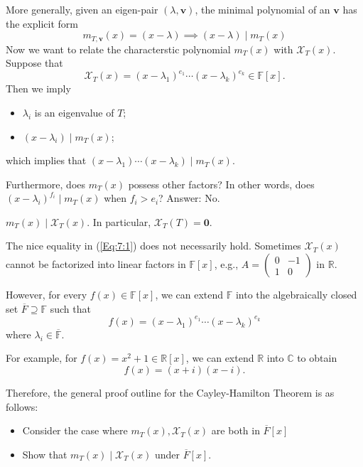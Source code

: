 \begin{remark}
More generally, given an eigen-pair $(\lambda,\bm v)$, the minimal polynomial of an $\bm v$ has the explicit form
\[
m_{T,\bm v}(x) =  (x-\lambda)\implies
(x-\lambda)\mid m_T(x)
\]
Now we want to relate the characterstic polynomial $m_T(x)$ with $\mathcal{X}_T(x)$.
Suppose that
\begin{equation}\label{Eq:7:1}
\mathcal{X}_T(x) = (x-\lambda_1)^{e_1}\cdots(x-\lambda_k)^{e_k}\in\mathbb{F}[x].
\end{equation}
Then we imply
\begin{itemize}
\item
$\lambda_i$ is an eigenvalue of $T$;
\item
$(x-\lambda_i)\mid m_T(x)$;
\end{itemize}
which implies that $(x-\lambda_1)\cdots(x-\lambda_k)\mid m_T(x)$.

Furthermore, does $m_T(x)$ possess other factors?
In other words, does $(x-\lambda_i)^{f_i}\mid m_T(x)$ when $f_i>e_i$?
Answer: No.
\end{remark}
\begin{theorem}
$m_T(x)\mid\mathcal{X}_T(x)$. In particular, $\mathcal{X}_T(T)=\bm0$.
\end{theorem}
The nice equality in (\ref{Eq:7:1}) does not necessarily hold. 
Sometimes $\mathcal{X}_{T}(x)$ cannot be factorized into linear factors in $\mathbb{F}[x]$, e.g., $A=\begin{pmatrix}
0&-1\\1&0
\end{pmatrix}$ in $\mathbb{R}$.

However, for every $f(x)\in\mathbb{F}[x]$, we can extend $\mathbb{F}$ into the algebraically closed set $\overline{F}\supseteq\mathbb{F}$ such that
\[
f(x) = (x-\lambda_1)^{e_1}\cdots(x-\lambda_k)^{e_k}
\]
where $\lambda_i\in\overline{\mathbb{F}}$.

For example, for $f(x) = x^2+1\in\mathbb{R}[x]$, we can extend $\mathbb{R}$ into $\mathbb{C}$ to obtain
\[
f(x) = (x+i)(x-i).
\]

Therefore, the general proof outline for the Cayley-Hamilton Theorem is as follows:
\begin{itemize}
\item
Consider the case where $m_T(x),\mathcal{X}_T(x)$ are both in $\overline{F}[x]$
\item
Show that $m_T(x)\mid\mathcal{X}_T(x)$ under $\overline{F}[x]$.
\end{itemize}

